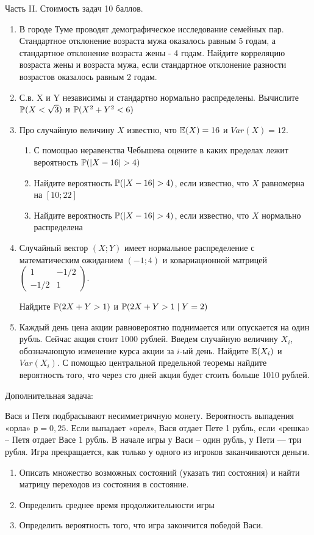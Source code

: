 \documentclass[pdftex,12pt,a4paper]{article}
\begin{document}
Часть II. Стоимость задач 10 баллов.

\begin{enumerate}
\item В  городе Туме проводят демографическое исследование семейных пар. Стандартное отклонение возраста мужа оказалось равным 5 годам, а стандартное отклонение возраста жены - 4 годам. Найдите корреляцию возраста жены и возраста мужа, если стандартное отклонение разности возрастов оказалось равным 2 годам.

\item С.в. X и Y независимы и стандартно нормально распределены. Вычислите $\P(X<\sqrt{3})$ и $\P(X^2+Y^2<6)$

\item  Про случайную величину $X$ известно, что $\E(X)=16$ и $Var(X)=12$.
\begin{enumerate}
\item С помощью неравенства Чебышева оцените в каких пределах лежит вероятность $\P(|X-16|>4)$
\item Найдите вероятность $\P(|X-16|>4)$, если известно, что $X$ равномерна на $[10;22]$
\item Найдите вероятность $\P(|X-16|>4)$, если известно, что $X$ нормально распределена
\end{enumerate}


\item Случайный вектор $(X;Y)$ имеет нормальное распределение с математическим ожиданием $(-1;4)$ и ковариационной матрицей $\left( \begin{array}{cc}
1 & -1/2 \\ 
-1/2 & 1
\end{array} \right)$. 


Найдите   $\P(2X+Y>1)$ и $\P(2X+Y>1 \mid Y=2)$

\item Каждый день цена акции равновероятно поднимается или опускается на один рубль. Сейчас акция стоит 1000 рублей. Введем случайную величину $X_i$, обозначающую изменение курса акции за $i$-ый день. Найдите $\E(X_i)$  и $Var(X_i)$. С помощью центральной предельной теоремы найдите вероятность того, что через сто дней акция будет стоить больше 1010 рублей.
\end{enumerate}



Дополнительная задача:

Вася и Петя подбрасывают несимметричную монету. Вероятность выпадения «орла» $р=0,25$. Если выпадает «орел», Вася отдает Пете 1 рубль, если «решка» -- Петя отдает Васе 1 рубль. В начале игры у Васи -- один рубль, у Пети --- три рубля. Игра прекращается, как только у одного из игроков заканчиваются деньги. 
\begin{enumerate}
\item Описать множество возможных состояний (указать тип состояния) и найти матрицу переходов из состояния в состояние.
\item Определить среднее время продолжительности игры
\item Определить вероятность того, что игра закончится победой Васи.
\end{enumerate}
\end{document}
